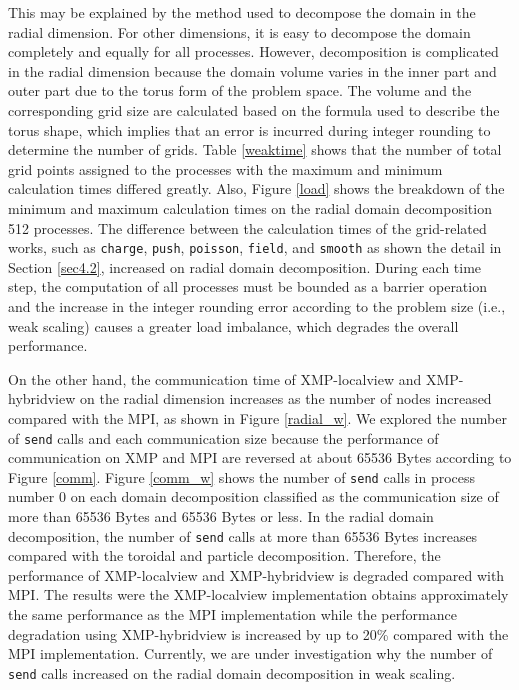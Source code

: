 This may be explained by the method used to decompose the domain in the radial dimension. For other dimensions, it is easy to decompose the domain completely and equally for all processes. However, decomposition is complicated in the radial dimension because the domain volume varies in the inner part and outer part due to the torus form of the problem space. The volume and the corresponding grid size are calculated based on the formula used to describe the torus shape, which implies that an error is incurred during integer rounding to determine the number of grids. Table \ref{weaktime} shows that the number of total grid points assigned to the processes with the maximum and minimum calculation times differed greatly. Also, Figure \ref{load} shows the breakdown of the minimum and maximum calculation times on the radial domain decomposition 512 processes. The difference between the calculation times of the grid-related works, such as {\tt charge}, {\tt push}, {\tt poisson}, {\tt field}, and {\tt smooth} as shown the detail in Section \ref{sec4.2}, increased on radial domain decomposition. During each time step, the computation of all processes must be bounded as a barrier operation and the increase in the integer rounding error according to the problem size (i.e., weak scaling) causes a greater load imbalance, which degrades the overall performance. 

On the other hand, the communication time of XMP-localview and XMP-hybridview on the radial dimension increases as the number of nodes increased compared with the MPI, as shown in Figure \ref{radial_w}. We explored the number of {\tt send} calls and each communication size because the performance of communication on XMP and MPI are reversed at about 65536 Bytes according to Figure \ref{comm}. Figure \ref{comm_w} shows the number of {\tt send} calls in process number 0 on each domain decomposition classified as the communication size of more than 65536 Bytes and 65536 Bytes or less. In the radial domain decomposition, the number of {\tt send} calls at more than 65536 Bytes increases compared with the toroidal and particle decomposition. Therefore, the performance of XMP-localview and XMP-hybridview is degraded compared with MPI. The results were the XMP-localview implementation obtains approximately the same performance as the MPI implementation while the performance degradation using XMP-hybridview is increased by up to 20\% compared with the MPI implementation. Currently, we are under investigation why the number of {\tt send} calls increased on the radial domain decomposition in weak scaling.


